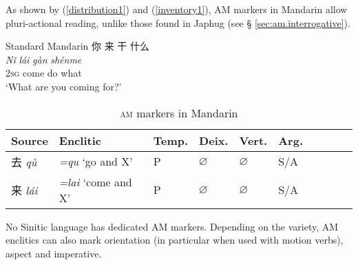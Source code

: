 \documentclass[oneside,a4paper,11pt]{article}
\newcommand{\ipa}[1]{{\phon\textit{#1}}}
\newcommand{\zh}[1]{{\cn #1}}
\newcommand{\sens}[1]{‘#1’}
\begin{document}
As shown by (\ref{distribution1}) and (\ref{inventory1}), AM markers in Mandarin allow pluri-actional reading, unlike those found in Japhug (see § \ref{sec:am.interrogative}).

\begin{exe}
\ex Standard Mandarin \label{inventory1}
\glll
\zh{你} \zh{来} \zh{干} \zh{什么}  \\
\ipa{Nǐ} \ipa{lái} \ipa{gàn} \ipa{shénme}  \\
\textsc{2sg} come do what \\
 \glt \sens{What are you coming for?}
\end{exe}

\begin{table} [H]
\caption{\textsc{am} markers in Mandarin} \centering
\begin{tabular}{llllllllll}
\toprule
Source &Enclitic & Temp.& Deix. & Vert.& Arg. \\
\midrule
\zh{去} \ipa{qù} &	\ipa{=qu} `go and X' &	P &		$\varnothing$ &$\varnothing$&	S/A & \\
 \zh{来}  \ipa{lái} &	\ipa{=lai} `come and X' &	P &		$\varnothing$ &$\varnothing$&	S/A & \\
\bottomrule
\end{tabular}
\end{table}


No Sinitic language has  dedicated AM markers. Depending on the variety, AM enclitics can also mark orientation (in particular when used with motion verbs), aspect and imperative.
\end{document}

